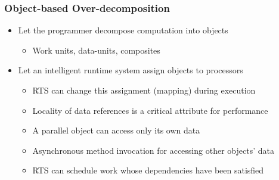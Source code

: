 
\begin{frame}
  \frametitle{Object-based Over-decomposition}
  \begin{itemize} 
    \item Let the programmer decompose computation into objects
    \begin{itemize}
       \item Work units, data-units, composites
    \end{itemize}
    \item Let an intelligent runtime system assign objects to processors
    \begin{itemize}
      \item RTS can change this assignment (mapping) during execution
      \item Locality of data references is a critical attribute for performance 
      \item A parallel object can access only its own data
      \item Asynchronous method invocation for accessing other objects’ data
      \item RTS can schedule work whose dependencies have been satisfied
    \end{itemize}
\end{itemize}
\end{frame}


